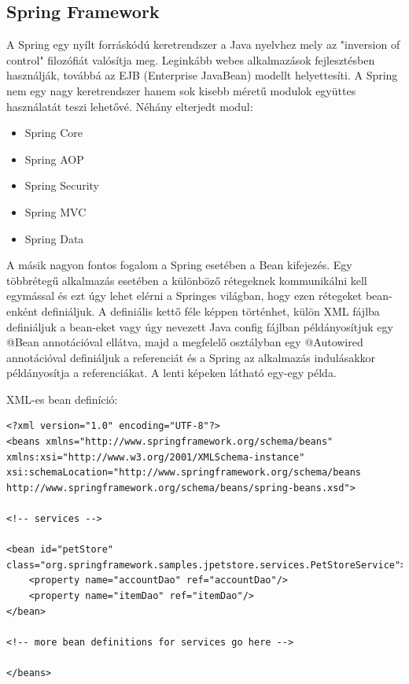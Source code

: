 \documentclass{article}
\begin{document}
\subsection{Spring Framework}\label{subsec:spring}
A Spring egy nyílt forráskódú keretrendszer a Java nyelvhez mely az "inversion of control" filozófiát valósítja meg. Leginkább webes alkalmazások fejlesztésben használják, továbbá az EJB (Enterprise JavaBean) modellt helyettesíti. A Spring nem egy nagy keretrendszer hanem sok kisebb méretű modulok együttes használatát teszi lehetővé. Néhány elterjedt modul:
\begin{itemize}
	\item Spring Core
	\item Spring AOP
	\item Spring Security
	\item Spring MVC
	\item Spring Data
\end{itemize}
A másik nagyon fontos fogalom a Spring esetében a Bean kifejezés. Egy többrétegű alkalmazás esetében a különböző rétegeknek kommunikálni kell egymással és ezt úgy lehet elérni a Springes világban, hogy ezen rétegeket bean-enként definiáljuk. A definiális kettő féle képpen történhet, külön XML fájlba definiáljuk a bean-eket vagy úgy nevezett Java config fájlban példányosítjuk egy @Bean annotációval ellátva, majd a megfelelő osztályban egy @Autowired annotációval definiáljuk a referenciát és a Spring az alkalmazás indulásakkor példányosítja a referenciákat. A lenti képeken látható egy-egy példa.

XML-es bean definíció:
\begin{lstlisting}
<?xml version="1.0" encoding="UTF-8"?>
<beans xmlns="http://www.springframework.org/schema/beans"
xmlns:xsi="http://www.w3.org/2001/XMLSchema-instance"
xsi:schemaLocation="http://www.springframework.org/schema/beans
http://www.springframework.org/schema/beans/spring-beans.xsd">

<!-- services -->

<bean id="petStore" 
class="org.springframework.samples.jpetstore.services.PetStoreService">
	<property name="accountDao" ref="accountDao"/>
	<property name="itemDao" ref="itemDao"/>
</bean>

<!-- more bean definitions for services go here -->

</beans>
\end{lstlisting}
\end{document}
